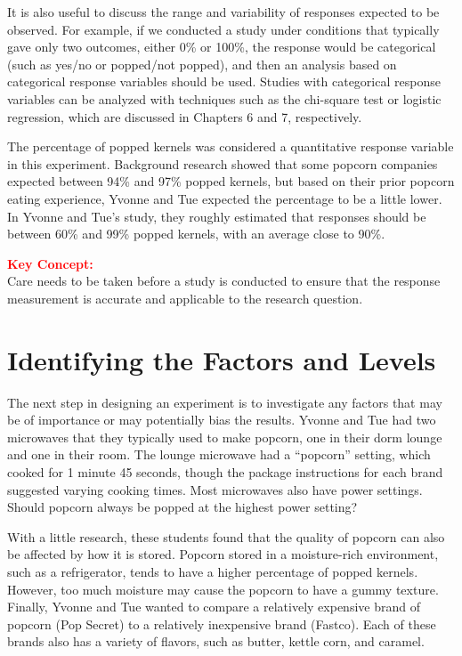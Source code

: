 \documentclass[
]{report}
\begin{document}
It is also useful to discuss the range and variability of responses expected to be observed. For example, if we conducted a study under conditions that typically gave only two outcomes, either 0\% or 100\%, the response would be categorical (such as yes/no or popped/not popped), and then an analysis based on categorical response variables should be used. Studies with categorical response variables can be analyzed with techniques such as the chi-square test or logistic regression, which are discussed in Chapters 6 and 7, respectively.

The percentage of popped kernels was considered a quantitative response variable in this experiment. Background research showed that some popcorn companies expected between 94\% and 97\% popped kernels, but based on their prior popcorn eating experience, Yvonne and Tue expected the percentage to be a little lower. In Yvonne and Tue's study, they roughly estimated that responses should be between 60\% and 99\% popped kernels, with an average close to 90\%.

\large

\textbf{\textcolor{red}{Key Concept:}}\\
\color{red}
Care needs to be taken before a study is conducted to ensure that the response measurement is accurate and applicable to the research question.\\
\color{black}
\normalsize

\hypertarget{identifying-the-factors-and-levels}{%
\section{\texorpdfstring{\textbf{Identifying the Factors and Levels}}{Identifying the Factors and Levels}}\label{identifying-the-factors-and-levels}}

The next step in designing an experiment is to investigate any factors that may be of importance or may potentially bias the results. Yvonne and Tue had two microwaves that they typically used to make popcorn, one in their dorm lounge and one in their room. The lounge microwave had a ``popcorn'' setting, which cooked for 1 minute 45 seconds, though the package instructions for each brand suggested varying cooking times. Most microwaves also have power settings. Should popcorn always be popped at the highest power setting?

With a little research, these students found that the quality of popcorn can also be affected by how it is stored. Popcorn stored in a moisture-rich environment, such as a refrigerator, tends to have a higher percentage of popped kernels. However, too much moisture may cause the popcorn to have a gummy texture. Finally, Yvonne and Tue wanted to compare a relatively expensive brand of popcorn (Pop Secret) to a relatively inexpensive brand (Fastco). Each of these brands also has a variety of flavors, such as butter, kettle corn, and caramel.
\end{document}
